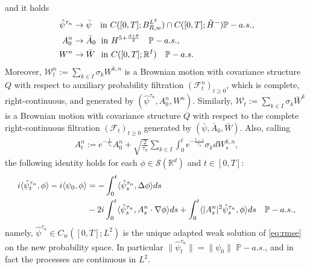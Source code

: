 \documentclass[a4paper,10pt]{amsart}
\newcommand{\R}{\mathbb{R}}
\theoremstyle{remark}
\numberwithin{equation}{section}
\begin{document}
and it holds
\begin{align}
 \hat{\psi}^{\tau_n}&\rightarrow \bar{\psi}\quad\text{in }C([0,T];B^{L^2}_{R,w})
    \cap C([0,T];\tilde{H}^-) \mathbb{P}-a.s.,\label{convergence_psi_n}\\
 A^{n}_0&\rightarrow \bar{A}_0 \quad\hspace{-0.14cm}\text{in }H^{5+\frac{d+\theta}{2}}\quad \mathbb{P}-a.s.,\notag\\
 W^n&\rightarrow \bar{W}\quad \hspace{-0.1cm}\text{in }C([0,T];\R^I)\quad \mathbb{P}-a.s.\notag
\end{align}
Moreover, $\mathcal{W}^n_t:=\sum_{k\in I}\sigma_k W^{k,n}$ is a Brownian motion with covariance structure $Q$ with respect to auxiliary probability filtration $(\mathcal{F}^n_t)_{t\geq 0}$, which is complete, right-continuous, and generated by $(\hat{\psi}^{\tau_n},A^{n}_0,W^n).$ Similarly, $\mathcal{W}_t:=\sum_{k\in I}\sigma_k \bar{W}^{k}$ is a Brownian motion with covariance structure $Q$ with respect to the complete right-continuous filtration $(\mathcal{F}_t)_{t\geq 0}$ generated by $(\bar{\psi}, \bar{A}_0,\bar{W}).$
Also, calling
\begin{align*}
    A^{n}_t:=e^{-\frac{t}{\tau_n}}A_0^{n}+\sqrt{\frac{2}{\tau_n}}\sum_{k\in I}\int_0^t e^{-\frac{t-s}{\tau_n}}\sigma_k dW^{k,n}_s,
\end{align*}
the following identity holds for each $\phi\in\mathscr{S}(\R^d)$ and
$t\in[0,T]$:
   \begin{align}\label{eq:weak_formulation_changed_space_prelimit_averaging}
       i\langle \hat{\psi}^{\tau_n}_t,\phi\rangle-i\langle\psi_0,\phi\rangle&=-\int_0^t \langle\hat{\psi}^{\tau_n}_s, \Delta\phi\rangle ds\notag\\ &-2i\int_0^t\langle \hat{\psi}^{\tau_n}_s,A^{n}_s\cdot\nabla\phi\rangle ds+\int_0^t \langle|A^{n}_s|^2 \hat{\psi}^{\tau_n}_s, \phi\rangle ds\quad \mathbb{P}-a.s.,
   \end{align}
namely, $\hat\psi^{\tau_n} \in C_{w}([0,T];L^2)$ is the unique adapted weak solution
of \eqref{eq:rmse} on the new probability space. In particular
$\|\hat{\psi}^{\tau_n}_t\|=\|\psi_0\|$ $\mathbb{P}-a.s.$, and in fact the processes
are continuous in $L^2$.
\end{document}
